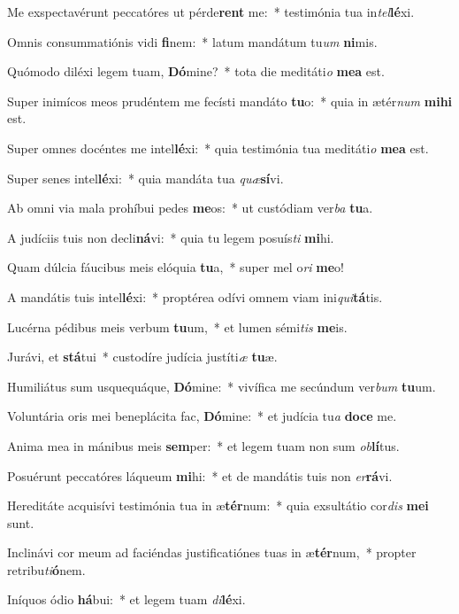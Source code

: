 \item Me exspectavérunt peccatóres ut pérde\textbf{rent} me:~* testimónia tua in\textit{tel}\textbf{lé}xi.
\item Omnis consummatiónis vidi \textbf{fi}nem:~* latum mandátum tu\textit{um} \textbf{ni}mis.
\item Quómodo diléxi legem tuam, \textbf{Dó}mine?~* tota die meditáti\textit{o} \textbf{me}\textbf{a} est.
\item Super inimícos meos prudéntem me fecísti mandáto \textbf{tu}o:~* quia in ætér\textit{num} \textbf{mi}\textbf{hi} est.
\item Super omnes docéntes me intel\textbf{lé}xi:~* quia testimónia tua meditáti\textit{o} \textbf{me}\textbf{a} est.
\item Super senes intel\textbf{lé}xi:~* quia mandáta tua \textit{quæ}\textbf{sí}vi.
\item Ab omni via mala prohíbui pedes \textbf{me}os:~* ut custódiam ver\textit{ba} \textbf{tu}a.
\item A judíciis tuis non decli\textbf{ná}vi:~* quia tu legem posuís\textit{ti} \textbf{mi}hi.
\item Quam dúlcia fáucibus meis elóquia \textbf{tu}a,~* super mel o\textit{ri} \textbf{me}o!
\item A mandátis tuis intel\textbf{lé}xi:~* proptérea odívi omnem viam ini\textit{qui}\textbf{tá}tis.
\item Lucérna pédibus meis verbum \textbf{tu}um,~* et lumen sémi\textit{tis} \textbf{me}is.
\item Jurávi, et \textbf{stá}tui~* custodíre judícia justíti\textit{æ} \textbf{tu}æ.
\item Humiliátus sum usquequáque, \textbf{Dó}mine:~* vivífica me secúndum ver\textit{bum} \textbf{tu}um.
\item Voluntária oris mei beneplácita fac, \textbf{Dó}mine:~* et judícia tu\textit{a} \textbf{do}\textbf{ce} me.
\item Anima mea in mánibus meis \textbf{sem}per:~* et legem tuam non sum \textit{ob}\textbf{lí}tus.
\item Posuérunt peccatóres láqueum \textbf{mi}hi:~* et de mandátis tuis non \textit{er}\textbf{rá}vi.
\item Hereditáte acquisívi testimónia tua in æ\textbf{tér}num:~* quia exsultátio cor\textit{dis} \textbf{me}\textbf{i} sunt.
\item Inclinávi cor meum ad faciéndas justificatiónes tuas in æ\textbf{tér}num,~* propter retribu\textit{ti}\textbf{ó}nem.
\item Iníquos ódio \textbf{há}bui:~* et legem tuam \textit{di}\textbf{lé}xi.
